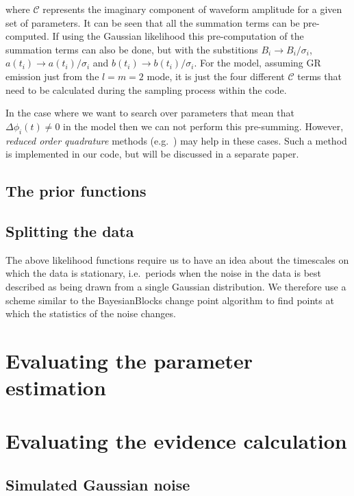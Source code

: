 \documentclass[aps,prd,showpacs,superscriptaddress,twocolumn,preprintnumbers,altaffilletter]{revtex4-1}
\begin{document}
where $\mathcal{C}$ represents the imaginary component of waveform amplitude for a given set of parameters.
It can be seen that all the summation terms can be pre-computed. If using the Gaussian likelihood this
pre-computation of the summation terms can also be done, but with the substitions $B_i \rightarrow
B_i/\sigma_i$, $a(t_i) \rightarrow a(t_i)/\sigma_i$ and $b(t_i) \rightarrow b(t_i)/\sigma_i$. For the model,
assuming GR emission just from the $l=m=2$ mode, it is just the four different $\mathcal{C}$ terms that need
to be calculated during the sampling process within the code.

In the case where we want to search over parameters that mean that $\Delta\phi_i(t) \ne 0$ in the model then
we can not perform this pre-summing. However, {\it reduced order quadrature} methods (e.g.\
\cite{2014PhRvX...4c1006F, 2015PhRvL.114g1104C}) may help in these cases. Such a method is implemented in our
code, but will be discussed in a separate paper.

\subsection{The prior functions}

\subsection{Splitting the data}\label{sec:splitting}

The above likelihood functions require us to have an idea about the timescales on which the data is
stationary, i.e.\ periods when the noise in the data is best described as being drawn from a single
Gaussian distribution. We therefore use a scheme similar to the BayesianBlocks change point algorithm
\cite{1998ApJ...504..405S} to find points at which the statistics of the noise changes.

\section{Evaluating the parameter estimation}

\section{Evaluating the evidence calculation}

\subsection{Simulated Gaussian noise}
\end{document}
